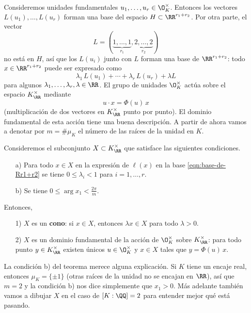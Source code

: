 \vspace{1em}

Consideremos unidades fundamentales $u_1, \ldots, u_r \in \O_K^\times$. Entonces
los vectores $L (u_1), \ldots, L (u_r)$ forman una base del espacio
$H \subset \RR^{r_1+r_2}$. Por otra parte, el vector
$$L = (\underbrace{1,\ldots,1}_{r_1}, \underbrace{2,\ldots,2}_{r_2})$$
no está en $H$, así que los $L (u_i)$ junto con $L$ forman una base de
$\RR^{r_1+r_2}$: todo $x \in \RR^{r_1+r_2}$ puede ser expresado como
\begin{equation}
  \label{eqn:base-de-Rr1+r2}
  \lambda_1 \, L (u_1) + \cdots + \lambda_r \, L (u_r) + \lambda L
\end{equation}
para algunos $\lambda_1,\ldots,\lambda_r,\lambda \in \RR$.
El grupo de unidades $\O_K^\times$ actúa sobre el espacio $K_\RR^\times$ mediante
$$u \cdot x = \Phi (u)\,x$$
(multiplicación de dos vectores en $K_\RR^\times$ punto por punto). El dominio
fundamental de esta acción tiene una buena descripción.
A partir de ahora vamos a denotar por $m = \# \mu_K$ el número de las raíces de
la unidad en $K$.

\begin{teorema}
  \label{thm:X-dominio-fundamental-de-OK*}
  Consideremos el subconjunto $X \subset K_\RR^\times$ que satisface las
  siguientes condiciones.
  \begin{enumerate}
  \item[a)] Para todo $x \in X$ en la expresión de $\ell (x)$ en la base
    \eqref{eqn:base-de-Rr1+r2} se tiene $0 \le \lambda_i < 1$ para
    $i = 1,\ldots,r$.

  \item[b)] Se tiene $0 \le \arg x_1 < \frac{2\pi}{m}$.
  \end{enumerate}

  Entonces,
  \begin{enumerate}
  \item[1)] $X$ es un \textbf{cono}: si $x \in X$, entonces $\lambda x \in X$
    para todo $\lambda > 0$.

  \item[2)] $X$ es un dominio fundamental de la acción de $\O_K^\times$ sobre
    $K_\RR^\times$: para todo punto $y \in K_\RR^\times$ existen únicos
    $u \in \O_K^\times$ y $x \in X$ tales que $y = \Phi (u)\,x$.
  \end{enumerate}
\end{teorema}

La condición b) del teorema merece alguna explicación. Si $K$ tiene un encaje
real, entonces $\mu_K = \{ \pm 1 \}$ (otras raíces de la unidad no se encajan en
$\RR$), así que $m = 2$ y la condición b) nos dice simplemente que $x_1 > 0$.
Más adelante también vamos a dibujar $X$ en el caso de $[K : \QQ] = 2$ para
entender mejor qué está pasando.

